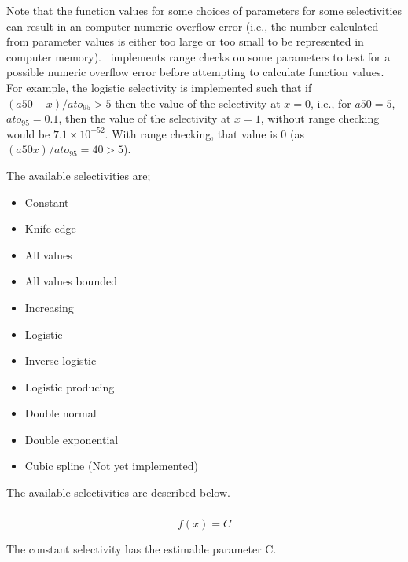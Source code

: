 Note that the function values for some choices of parameters for some selectivities can result in an computer numeric overflow error (i.e., the number calculated from parameter values is either too large or too small to be represented in computer memory). \CNAME\ implements range checks on some parameters to test for a possible numeric overflow error before attempting to calculate function values. For example, the logistic selectivity is implemented such that if $(a50-x)/ato_95 > 5$ then the value of the selectivity at $x=0$, i.e., for $a50=5$, $ato_95=0.1$, then the value of the selectivity at $x=1$, without range checking would be $7.1 \times 10^{-52}$. With range checking, that value is $0$ (as $(a50 x)/ato_95=40 > 5$).

The available selectivities are;

\begin{itemize}
  \item Constant
  \item Knife-edge
  \item All values
  \item All values bounded
  \item Increasing
  \item Logistic
  \item Inverse logistic
  \item Logistic producing
  \item Double normal
  \item Double exponential
  \item Cubic spline (Not yet implemented)
\end{itemize}

The available selectivities are described below.

\subsubsection[Constant]{}

\begin{equation}
f(x)=C
\end{equation}

The constant selectivity has the estimable parameter C. 

\subsubsection[Knife-edge]{}

